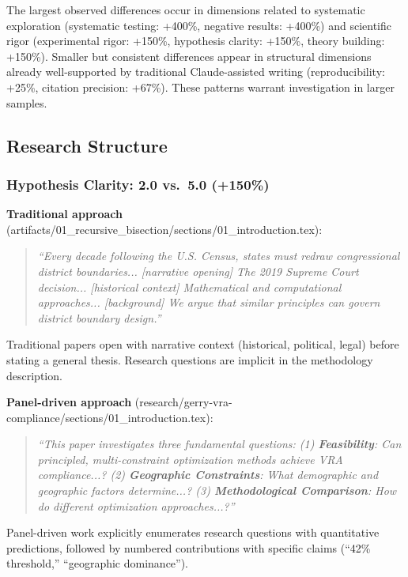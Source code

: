 The largest observed differences occur in dimensions related to systematic exploration (systematic testing: +400\%, negative results: +400\%) and scientific rigor (experimental rigor: +150\%, hypothesis clarity: +150\%, theory building: +150\%). Smaller but consistent differences appear in structural dimensions already well-supported by traditional Claude-assisted writing (reproducibility: +25\%, citation precision: +67\%). These patterns warrant investigation in larger samples.

\subsection{Research Structure}

\subsubsection{Hypothesis Clarity: 2.0 vs.\ 5.0 (+150\%)}

\textbf{Traditional approach} (artifacts/01\_recursive\_bisection/sections/01\_introduction.tex):

\begin{quote}
\textit{``Every decade following the U.S. Census, states must redraw congressional district boundaries... [narrative opening] The 2019 Supreme Court decision... [historical context] Mathematical and computational approaches... [background] We argue that similar principles can govern district boundary design.''}
\end{quote}

Traditional papers open with narrative context (historical, political, legal) before stating a general thesis. Research questions are implicit in the methodology description.

\textbf{Panel-driven approach} (research/gerry-vra-compliance/sections/01\_introduction.tex):

\begin{quote}
\textit{``This paper investigates three fundamental questions: (1) \textbf{Feasibility}: Can principled, multi-constraint optimization methods achieve VRA compliance...? (2) \textbf{Geographic Constraints}: What demographic and geographic factors determine...? (3) \textbf{Methodological Comparison}: How do different optimization approaches...?''}
\end{quote}

Panel-driven work explicitly enumerates research questions with quantitative predictions, followed by numbered contributions with specific claims (``42\% threshold,'' ``geographic dominance'').

